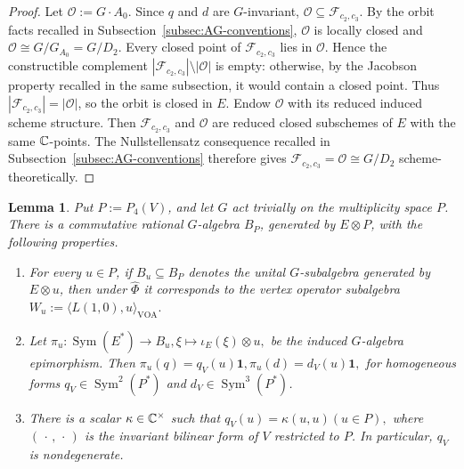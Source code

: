 \documentclass[10pt,a4paper]{amsart}
\numberwithin{equation}{section} \newtheorem{thm}{Theorem}[section] \newtheorem{lem}[thm]{Lemma} \newtheorem{ex}[thm]{Example} \newtheorem{prop}[thm]{Proposition} \newtheorem{cor}[thm]{Corollary} \newtheorem{defi}[thm]{Definition} \newtheorem{rmk}[thm]{Remark} \newtheorem{notation}[thm]{Notation}
\newcommand{\one}{\mathbf{1}}
\newcommand{\Sym}{\operatorname{Sym}}
\begin{document}
\begin{proof}
Let $\mathcal O:=G\cdot A_0$. Since $q$ and $d$ are $G$-invariant, $\mathcal O\subseteq\mathcal F_{c_2,c_3}$. By the orbit facts recalled in Subsection~\ref{subsec:AG-conventions}, $\mathcal O$ is locally closed and \(\mathcal O\cong G/G_{A_0}=G/D_2.\) Every closed point of $\mathcal F_{c_2,c_3}$ lies in $\mathcal O$. Hence the constructible complement \(|\mathcal F_{c_2,c_3}|\setminus|\mathcal O|\) is empty: otherwise, by the Jacobson property recalled in the same subsection, it would contain a closed point. Thus \(|\mathcal F_{c_2,c_3}|=|\mathcal O|\), so the orbit is closed in $E$. Endow $\mathcal O$ with its reduced induced scheme structure. Then $\mathcal F_{c_2,c_3}$ and $\mathcal O$ are reduced closed subschemes of $E$ with the same $\mathbb{C}$-points. The Nullstellensatz consequence recalled in Subsection~\ref{subsec:AG-conventions} therefore gives \(\mathcal F_{c_2,c_3}=\mathcal O\cong G/D_2\) scheme-theoretically.
\end{proof}

\begin{lem}\label{lem:k4-parameters}
Put $P:=P_4(V)$, and let $G$ act trivially on the multiplicity space $P$. There is a commutative rational $G$-algebra $B_P$, generated by $E\otimes P$, with the following properties.
\begin{enumerate}[label=(\roman*),leftmargin=2.1em]
\item For every $u\in P$, if $B_u\subseteq B_P$ denotes the unital
$G$-subalgebra generated by $E\otimes u$, then under $\widehat\Phi$ it corresponds to the vertex operator subalgebra \(W_u:=\langle L(1,0),u\rangle_{\mathrm{VOA}}.\)
\item Let
\(\pi_u:\Sym(E^*)\longrightarrow B_u, \xi\longmapsto \iota_E(\xi)\otimes u,\) be the induced $G$-algebra epimorphism. Then \(\pi_u(q)=q_V(u)\one, \pi_u(d)=d_V(u)\one,\) for homogeneous forms \(q_V\in\Sym^2(P^*)\) and \(d_V\in\Sym^3(P^*)\).
\item There is a scalar $\kappa\in\mathbb{C}^\times$ such that
\(q_V(u)=\kappa (u,u) (u\in P),\) where $(\,\cdot\,,\,\cdot\,)$ is the invariant bilinear form of $V$ restricted to $P$. In particular, $q_V$ is nondegenerate.
\end{enumerate}
\end{lem}
\end{document}
